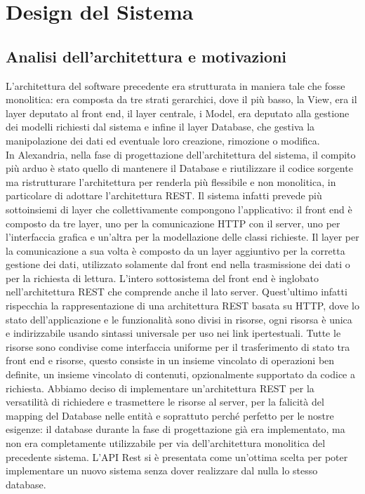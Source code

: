 \chapter{Design del Sistema}
\raggedright{\section{Analisi dell'architettura e motivazioni}}
L'architettura del software precedente era strutturata in maniera tale che fosse monolitica: era composta da tre strati gerarchici, dove il più basso, la View, era il \gls{layer} deputato al \gls{front end}, il layer centrale, i Model, era deputato alla gestione dei modelli richiesti dal sistema e infine il layer Database, che gestiva la manipolazione dei dati ed eventuale loro creazione, rimozione o modifica. \\
In Alexandria, nella fase di progettazione dell'architettura del sistema, il compito più arduo è stato quello di mantenere il Database e riutilizzare il codice sorgente ma ristrutturare l'architettura per renderla più flessibile e non monolitica, in particolare di adottare l'architettura \gls{REST}. Il sistema infatti prevede più sottoinsiemi di layer che collettivamente compongono l'applicativo: il front end è composto da tre layer, uno per la comunicazione \gls{HTTP} con il server, uno per l'interfaccia grafica e un'altra per la modellazione delle classi richieste. Il layer per la comunicazione a sua volta è composto da un layer aggiuntivo per la corretta gestione dei dati, utilizzato solamente dal front end nella trasmissione dei dati o per la richiesta di lettura. L'intero sottosistema del front end è inglobato nell'architettura \gls{REST} che comprende anche il lato server. Quest'ultimo infatti rispecchia la rappresentazione di una architettura REST basata su HTTP, dove lo stato dell'applicazione e le funzionalità sono divisi in risorse, ogni risorsa è unica e indirizzabile usando sintassi universale per uso nei link ipertestuali. Tutte le risorse sono condivise come interfaccia uniforme per il trasferimento di stato tra front end e risorse, questo consiste in un insieme vincolato di operazioni ben definite, un insieme vincolato di contenuti, opzionalmente supportato da codice a richiesta.
Abbiamo deciso di implementare un'architettura REST per la versatilità di richiedere e trasmettere le risorse al server, per la falicità del mapping del Database nelle entità e soprattuto perché perfetto per le nostre esigenze: il database durante la fase di progettazione già era implementato, ma non era completamente utilizzabile per via dell'architettura monolitica del precedente sistema. L'API Rest si è presentata come un'ottima scelta per poter implementare un nuovo sistema senza dover realizzare dal nulla lo stesso database.

